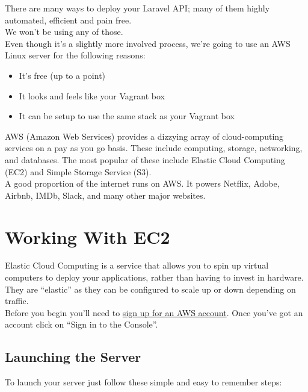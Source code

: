 There are many ways to deploy your Laravel API; many of them highly automated, efficient and pain free.
\\

We won't be using any of those.
\\

Even though it's a slightly more involved process, we're going to use an AWS Linux server for the following reasons:

\begin{itemize}
    \item It's free (up to a point)
    \item It looks and feels like your Vagrant box
    \item It can be setup to use the same stack as your Vagrant box
\end{itemize}

AWS (Amazon Web Services) provides a dizzying array of cloud-computing services on a pay as you go basis. These include computing, storage, networking, and databases. The most popular of these include Elastic Cloud Computing (EC2) and Simple Storage Service (S3).
\\

A good proportion of the internet runs on AWS. It powers Netflix, Adobe, Airbnb, IMDb, Slack, and many other major websites.



\section{Working With EC2}

Elastic Cloud Computing is a service that allows you to spin up virtual computers to deploy your applications, rather than having to invest in hardware. They are ``elastic'' as they can be configured to scale up or down depending on traffic.
\\

Before you begin you'll need to \href{https://portal.aws.amazon.com/gp/aws/developer/registration}{sign up for an AWS account}.  Once you've got an account click on ``Sign in to the Console''.


\subsection{Launching the Server}

To launch your server just follow these simple and easy to remember steps:

